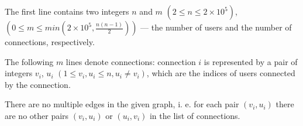 The first line contains two integers $n$ and $m$ $(2 \le n \le 2\times 10^5)$, $(0 \le m \le min(2 \times 10^5,\frac{n(n−1)}2))$ --- the number of users and the number of connections, respectively.

The following $m$ lines denote connections: connection $i$ is represented by a pair of integers $v_i$, $u_i$ $(1\le v_i,u_i\le n, u_i \neq v_i)$, which are the indices of users connected by the connection.

There are no multiple edges in the given graph, i. e. for each pair $(v_i,u_i)$ there are no other pairs $(v_i,u_i)$ or $(u_i,v_i)$ in the list of connections.
